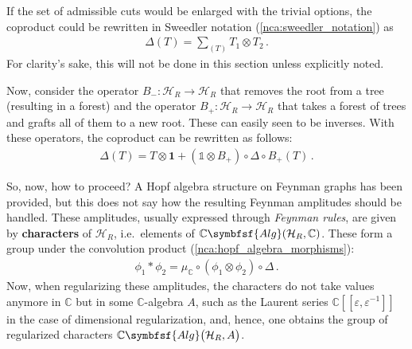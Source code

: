     \begin{remark}\label{qft:sweedler_notation}
        If the set of admissible cuts would be enlarged with the trivial options, the coproduct could be rewritten in Sweedler notation (\cref{nca:sweedler_notation}) as
        \begin{gather}
            \Delta(T) = \sum_{(T)}T_1\otimes T_2\,.
        \end{gather}
        For clarity's sake, this will not be done in this section unless explicitly noted.
    \end{remark}

    Now, consider the operator $B_-:\mathcal{H}_R\rightarrow\mathcal{H}_R$ that removes the root from a tree (resulting in a forest) and the operator $B_+:\mathcal{H}_R\rightarrow\mathcal{H}_R$ that takes a forest of trees and grafts all of them to a new root. These can easily seen to be inverses. With these operators, the coproduct can be rewritten as follows:
    \begin{gather}
        \Delta(T) = T\otimes\symbf{1} + (\mathbb{1}\otimes B_+)\circ\Delta\circ B_+(T)\,.
    \end{gather}

    So, now, how to proceed? A Hopf algebra structure on Feynman graphs has been provided, but this does not say how the resulting Feynman amplitudes should be handled. These amplitudes, usually expressed through \textit{Feynman rules}, are given by \textbf{characters} of $\mathcal{H}_R$, i.e.~elements of $\mathbb{C}\symbfsf{Alg}(\mathcal{H}_R,\mathbb{C})$. These form a group under the convolution product (\cref{nca:hopf_algebra_morphisms}):
    \begin{gather}
        \phi_1\ast\phi_2 = \mu_{\mathbb{C}}\circ(\phi_1\otimes\phi_2)\circ\Delta\,.
    \end{gather}
    Now, when regularizing these amplitudes, the characters do not take values anymore in $\mathbb{C}$ but in some $\mathbb{C}$-algebra $A$, such as the Laurent series $\mathbb{C}[[\varepsilon,\varepsilon^{-1}]]$ in the case of dimensional regularization, and, hence, one obtains the group of regularized characters $\mathbb{C}\symbfsf{Alg}\bigl(\mathcal{H}_R,A\bigr)$.


